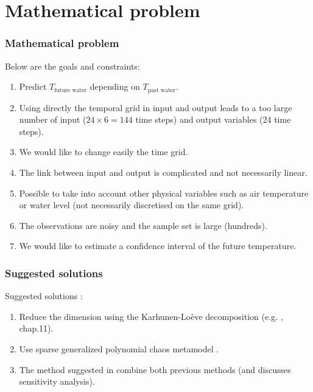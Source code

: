 \documentclass[10pt]{beamer}
\begin{document}

\section{Mathematical problem}

\begin{frame}
\frametitle{Mathematical problem}

Below are the goals and constraints:
\begin{enumerate}
\item Predict $T_{\textrm{future water}}$ depending on  $T_{\textrm{past water}}$. 

\item Using directly the temporal grid in input and output leads to a too 
large number of input ($24 \times 6 = 144$ time steps) and output variables (24 time 
steps). 

\item We would like to change easily the time grid. 

\item The link between input and output is complicated and not necessarily 
linear.

\item Possible to take into account other physical variables such as 
air temperature or water level (not necessarily discretised on the same grid).

\item The observations are noisy and the sample set is large (hundreds). 

\item We would like to estimate a confidence interval of the future temperature.
\end{enumerate}
\end{frame}


\begin{frame}
\frametitle{Suggested solutions}

Suggested solutions :
\begin{enumerate}
\item Reduce the dimension using the Karhunen-Loève decomposition (e.g. 
\cite{Sullivan2015}, chap.11).

\item Use sparse generalized polynomial chaos metamodel 
\cite{ghanem2003stochastic, xiu2002wiener, LeMaitre2010, blatman2011adaptive}.

\item The method suggested in \cite{Dutfoy2017} combine both previous methods 
(and discusses sensitivity analysis). 
\end{enumerate}

\end{frame}
\end{document}
